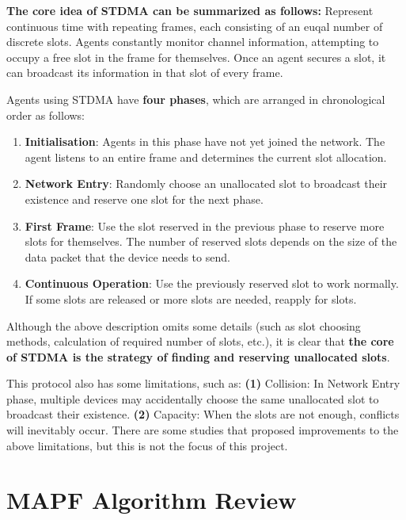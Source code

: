 \textbf{The core idea of STDMA can be summarized as follows:} Represent continuous time with repeating
frames, each consisting of an euqal number of discrete slots. Agents constantly monitor channel information,
attempting to occupy a free slot in the frame for themselves. Once an agent secures a slot, it can broadcast
its information in that slot of every frame.

Agents using STDMA have \textbf{four phases}, which are arranged in chronological order as follows:


\begin{enumerate}
  \item \textbf{Initialisation}: Agents in this phase have not yet joined the network. The agent listens to an entire frame and determines the current slot allocation.
  \item \textbf{Network Entry}:  Randomly choose an unallocated slot to broadcast their existence and reserve one slot for the next phase.
  \item \textbf{First Frame}: Use the slot reserved in the previous phase to reserve more slots for themselves. The number of reserved slots depends on the size of the data packet that the device needs to send.
  \item \textbf{Continuous Operation}: Use the previously reserved slot to work normally. If some slots are released or more slots are needed, reapply for slots.
\end{enumerate}

Although the above description omits some details (such as slot choosing methods,
 calculation of required number of slots, etc.), it is clear that
\textbf{the core of STDMA is the strategy of finding and reserving unallocated slots}.

This protocol also has some limitations, such as:
\textbf{(1)} Collision: In Network Entry phase, multiple devices may accidentally choose the same unallocated slot to broadcast their existence.
 \textbf{(2)} Capacity: When the slots are not enough, conflicts will inevitably occur. There are some studies \cite{STDMA_improv1,STDMA_improv2} that proposed improvements to the above limitations, but this is not the focus of this project.

\section{MAPF Algorithm Review}